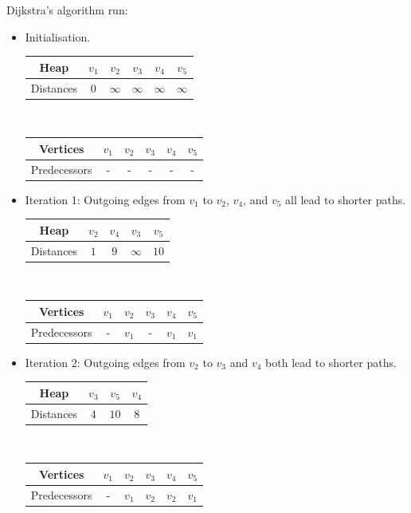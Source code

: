 \begin{table}[h]
	\begin{minipage}[t]{0.45 \textwidth}
	Dijkstra's algorithm \cite[p. 17, algo. 3]{FUH_algo_graphs_2021} run:
	\begin{itemize}
	\item Initialisation.
	
	\begin{tabular}{|c|ccccc|}
			\hline
			     Heap & $v_1$ & $v_2$ & $v_3$ & $v_4$ & $v_5$ \tabularnewline
			\hline
			Distances &  $0$  &  $\infty$ &  $\infty$ &     $\infty$ &    $\infty$ \tabularnewline
			\hline
	\end{tabular}\\
	\begin{tabular}{|c|ccccc|}
			\hline
			     Vertices & $v_1$ & $v_2$ & $v_3$ & $v_4$ & $v_5$ \tabularnewline
			\hline
			Predecessors &  -  &  - &  - &     - &    - \tabularnewline
			\hline
	\end{tabular}
	

	\item Iteration 1: Outgoing edges from $v_1$ to $v_2$, $v_4$, and $v_5$
		all lead to shorter paths.
	
	\begin{tabular}{|c|cccc|}
			\hline
			     Heap & $v_2$ & $v_4$ & $v_3$ & $v_5$ \tabularnewline
			\hline
			Distances &  $1$  &  $9$ &  $\infty$ &     $10$  \tabularnewline
			\hline
	\end{tabular}\\
	\begin{tabular}{|c|ccccc|}
			\hline
			     Vertices & $v_1$ & $v_2$ & $v_3$ & $v_4$ & $v_5$ \tabularnewline
			\hline
			Predecessors &  -  &  $v_1$ &  - &     $v_1$ &    $v_1$ \tabularnewline
			\hline
	\end{tabular}


	\item Iteration 2: Outgoing edges from $v_2$ to $v_3$ and $v_4$
		both lead to shorter paths.
	
	\begin{tabular}{|c|ccc|}
			\hline
			     Heap & $v_3$ & $v_5$ & $v_4$  \tabularnewline
			\hline
			Distances &  $4$  &  $10$ &  $8$  \tabularnewline
			\hline
	\end{tabular}\\
	\begin{tabular}{|c|ccccc|}
			\hline
			     Vertices & $v_1$ & $v_2$ & $v_3$ & $v_4$ & $v_5$ \tabularnewline
			\hline
			Predecessors &  -  &  $v_1$ &  $v_2$ &     $v_2$ &    $v_1$ \tabularnewline
			\hline
	\end{tabular}



\end{itemize}
\end{minipage}
\end{table}
